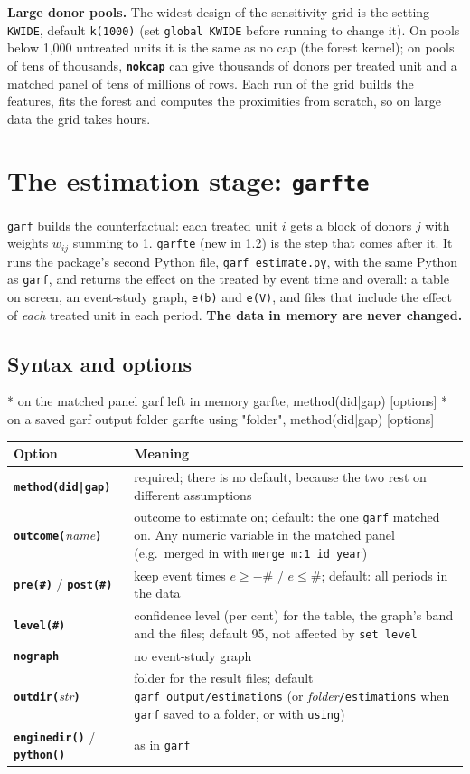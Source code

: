 \documentclass[11pt,a4paper]{article}
\newcommand{\opt}[1]{\texttt{\textbf{#1}}}
\newcommand{\code}[1]{\texttt{#1}}
\begin{document}
\medskip
\noindent\textbf{Large donor pools.} The widest design of the sensitivity grid is the setting
\code{KWIDE}, default \code{k(1000)} (set \code{global KWIDE} before running to change it). On pools below 1{,}000 untreated
units it is the same as no cap (the forest kernel); on pools of tens of thousands, \opt{nokcap}
can give thousands of donors per treated unit and a matched panel of tens of millions of rows. Each
run of the grid builds the features, fits the forest and computes the proximities from scratch, so
on large data the grid takes hours.

\section{The estimation stage: \texttt{garfte}}\label{sec:garfte}

\code{garf} builds the counterfactual: each treated unit $i$ gets a block of donors $j$ with
weights $w_{ij}$ summing to 1. \code{garfte} (new in 1.2) is the step that comes after it. It runs
the package's second Python file, \code{garf\_estimate.py}, with the same Python as \code{garf},
and returns the effect on the treated by event time and overall: a table on screen, an
event-study graph, \code{e(b)} and \code{e(V)}, and files that include the effect of \emph{each}
treated unit in each period. \textbf{The data in memory are never changed.}

\subsection{Syntax and options}
\begin{stata}
* on the matched panel garf left in memory
garfte, method(did|gap) [options]
* on a saved garf output folder
garfte using "folder", method(did|gap) [options]
\end{stata}
\begin{tabularx}{\textwidth}{@{}lX@{}}
\toprule
Option & Meaning\\
\midrule
\opt{method(did|gap)} & required; there is no default, because the two rest on different assumptions\\
\opt{outcome(}\emph{name}\opt{)} & outcome to estimate on; default: the one \code{garf} matched on. Any numeric variable in the matched panel (e.g.\ merged in with \code{merge m:1 id year})\\
\opt{pre(\#)} / \opt{post(\#)} & keep event times $e\ge-\#$ / $e\le\#$; default: all periods in the data\\
\opt{level(\#)} & confidence level (per cent) for the table, the graph's band and the files; default 95, not affected by \code{set level}\\
\opt{nograph} & no event-study graph\\
\opt{outdir(}\emph{str}\opt{)} & folder for the result files; default \code{garf\_output/estimations} (or \emph{folder}\code{/estimations} when \code{garf} saved to a folder, or with \code{using})\\
\opt{enginedir()} / \opt{python()} & as in \code{garf}\\
\bottomrule
\end{tabularx}
\end{document}
